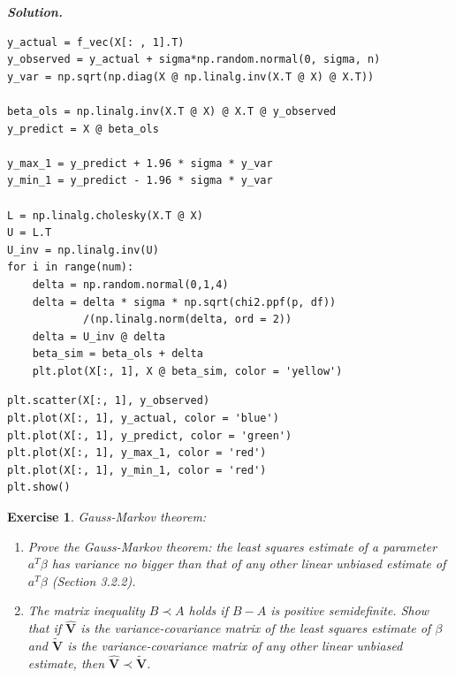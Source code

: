 \documentclass[12pt]{article}
\def\bV{\textbf{V}}
\def\bV{\textbf{V}}
\newtheorem{exercise}{Exercise}[section]
\newenvironment{solution}[1][\it{Solution}]{\textbf{#1. } }{\vspace{.5cm}}
\begin{document}
\begin{solution}
\begin{tcolorbox}[width=\linewidth, sharp corners=all, colback=white!95!black]
\begin{verbatim}
y_actual = f_vec(X[: , 1].T)
y_observed = y_actual + sigma*np.random.normal(0, sigma, n)
y_var = np.sqrt(np.diag(X @ np.linalg.inv(X.T @ X) @ X.T))

beta_ols = np.linalg.inv(X.T @ X) @ X.T @ y_observed
y_predict = X @ beta_ols

y_max_1 = y_predict + 1.96 * sigma * y_var
y_min_1 = y_predict - 1.96 * sigma * y_var

L = np.linalg.cholesky(X.T @ X)
U = L.T
U_inv = np.linalg.inv(U)
for i in range(num):
    delta = np.random.normal(0,1,4)
    delta = delta * sigma * np.sqrt(chi2.ppf(p, df))
            /(np.linalg.norm(delta, ord = 2))
    delta = U_inv @ delta
    beta_sim = beta_ols + delta
    plt.plot(X[:, 1], X @ beta_sim, color = 'yellow')
\end{verbatim}
\end{tcolorbox}
\begin{tcolorbox}[width=\linewidth, sharp corners=all, colback=white!95!black]

    \begin{verbatim}
plt.scatter(X[:, 1], y_observed)
plt.plot(X[:, 1], y_actual, color = 'blue')
plt.plot(X[:, 1], y_predict, color = 'green')
plt.plot(X[:, 1], y_max_1, color = 'red')
plt.plot(X[:, 1], y_min_1, color = 'red')
plt.show()
\end{verbatim}
\end{tcolorbox}

\end{solution}

\begin{exercise} Gauss-Markov theorem:
\begin{enumerate}
\item[(a)] Prove the Gauss-Markov theorem: the least squares estimate of a
parameter $a^T \beta$ has variance no bigger than that of any other linear
unbiased estimate of $a^T \beta$ (Section 3.2.2).
\item[(b)] The matrix inequality $B \prec A$ holds if $B-A$ is positive semidefinite. Show that if $\hat{\bV}$ is the variance-covariance matrix of the least squares estimate of $\beta$ and $\tilde{\bV}$ is the variance-covariance matrix of any other
linear unbiased estimate, then $\hat{\bV} \prec \tilde{\bV}$.
\end{enumerate}
\end{exercise}
\end{document}
